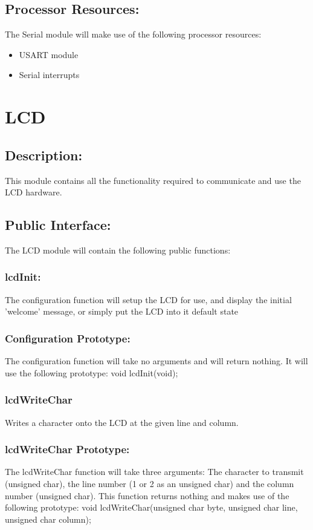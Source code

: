 \documentclass[]{article}
\begin{document}
\subsection{Processor Resources:}
The Serial module will make use of the following processor resources:
\begin{itemize}
	\item USART module
	\item Serial interrupts
\end{itemize}

\newpage
\section{LCD}
 
\subsection{Description:}
This module contains all the functionality required to communicate and use the LCD hardware.

\subsection{Public Interface:}
The LCD module will contain the following public functions:

\subsubsection{lcdInit:}
The configuration function will setup the LCD for use, and display the initial 'welcome' message, or simply put the LCD into it default state

\subsubsection{Configuration Prototype:}
The configuration function will take no arguments and will return nothing. It will use the following prototype: \newline \newline
void lcdInit(void);

\subsubsection{lcdWriteChar}
Writes a character onto the LCD at the given line and column.

\subsubsection{lcdWriteChar Prototype:}
The lcdWriteChar function will take three arguments: The character to transmit (unsigned char), the line number (1 or 2 as an unsigned char) and the column number (unsigned char). This function returns nothing and makes use of the following prototype: \newline \newline
void lcdWriteChar(unsigned char byte, unsigned char line, unsigned char column);
\end{document}
